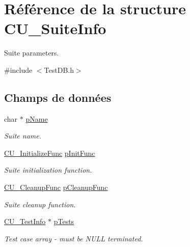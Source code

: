 \hypertarget{structCU__SuiteInfo}{\section{Référence de la structure C\-U\-\_\-\-Suite\-Info}
\label{structCU__SuiteInfo}
}


Suite parameters.  




{\ttfamily \#include $<$Test\-D\-B.\-h$>$}

\subsection*{Champs de données}
\begin{DoxyCompactItemize}
\item 
char $\ast$ \hyperlink{structCU__SuiteInfo_adfd97039a37a46383eba735f20dc4831}{p\-Name}
\begin{DoxyCompactList}\small\item\em Suite name. \end{DoxyCompactList}\item 
\hyperlink{group__Framework_gaab4b8ad3aa3a3c222c43c8a330de11e3}{C\-U\-\_\-\-Initialize\-Func} \hyperlink{structCU__SuiteInfo_a2716df9d804ab99c9b84b78b7f951aa2}{p\-Init\-Func}
\begin{DoxyCompactList}\small\item\em Suite initialization function. \end{DoxyCompactList}\item 
\hypertarget{structCU__SuiteInfo_a61c244259454b00b3ceb94663ebfbf5a}{\hyperlink{group__Framework_ga90966c0bede742195897c3aeff4c342b}{C\-U\-\_\-\-Cleanup\-Func} \hyperlink{structCU__SuiteInfo_a61c244259454b00b3ceb94663ebfbf5a}{p\-Cleanup\-Func}}\label{structCU__SuiteInfo_a61c244259454b00b3ceb94663ebfbf5a}

\begin{DoxyCompactList}\small\item\em Suite cleanup function. \end{DoxyCompactList}\item 
\hyperlink{structCU__TestInfo}{C\-U\-\_\-\-Test\-Info} $\ast$ \hyperlink{structCU__SuiteInfo_a1fdb8ec9bbc72962dbbc95f156856463}{p\-Tests}
\begin{DoxyCompactList}\small\item\em Test case array -\/ must be N\-U\-L\-L terminated. \end{DoxyCompactList}\end{DoxyCompactItemize}


